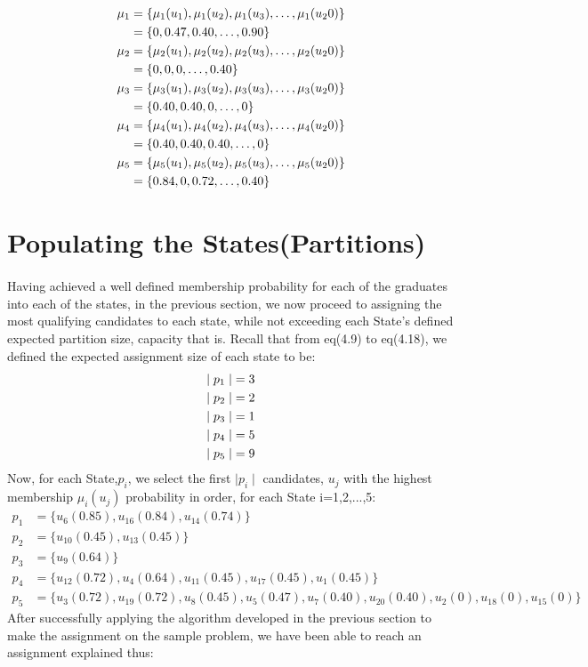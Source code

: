 \documentclass[a4paper]{book}
\begin{document}
				\begin{align}
					\mu_1 &= \{ \mu_1(u_1), \mu_1(u_2), \mu_1(u_3),\dots,\mu_1(u_20) \} \\
					&= \{ 0, 0.47, 0.40,\dots,0.90 \} \notag \\
					\mu_2 &= \{ \mu_2(u_1), \mu_2(u_2), \mu_2(u_3),\dots,\mu_2(u_20) \}\\
					&= \{ 0, 0, 0,\dots,0.40 \} \notag \\
					\mu_3 &= \{ \mu_3(u_1), \mu_3(u_2), \mu_3(u_3),\dots,\mu_3(u_20) \}\\
					&= \{ 0.40, 0.40, 0,\dots,0 \} \notag \\
					\mu_4 &= \{ \mu_4(u_1), \mu_4(u_2), \mu_4(u_3),\dots,\mu_4(u_20) \}\\
					&= \{ 0.40, 0.40, 0.40,\dots,0 \} \notag \\
					\mu_5 &= \{ \mu_5(u_1), \mu_5(u_2), \mu_5(u_3),\dots,\mu_5(u_20) \}\\
					&= \{ 0.84, 0, 0.72,\dots,0.40 \} \notag					
				\end{align}
		\section{Populating the States(Partitions)}
			\paragraph{}
				Having achieved a well defined membership probability for each of the graduates into each of the states, in the previous section, we now proceed to assigning the most qualifying candidates to each state, while not exceeding each State's defined expected partition size, capacity that is.
				Recall that from eq(4.9) to eq(4.18), we defined the expected assignment size of each state to be:
				\begin{align}
					\mid p_1 \mid &= 3 \notag \\
					\mid p_2 \mid &= 2 \notag \\
					\mid p_3 \mid &= 1 \notag \\
					\mid p_4 \mid &= 5 \notag \\
					\mid p_5 \mid &= 9 \notag
				\end{align}
				Now, for each State,$p_i$, we select the first $\mid p_i \mid$ candidates, $u_j$ with the highest membership $\mu_i(u_j)$ probability in order, for each State i=1,2,...,5:
				\begin{align}
					p_1 &= \{u_6(0.85), u_{16}(0.84), u_{14}(0.74)\}\\
					p_2 &= \{u_{10}(0.45), u_{13}(0.45)\}\\
					p_3 &= \{u_{9}(0.64)\}\\
					p_4 &= \{u_{12}(0.72),u_{4}(0.64),u_{11}(0.45),u_{17}(0.45),u_{1}(0.45)\}\\
					p_5 &= \{u_{3}(0.72),u_{19}(0.72),u_{8}(0.45),u_{5}(0.47),u_{7}(0.40),u_{20}(0.40),u_{2}(0),u_{18}(0),u_{15}(0)\}
				\end{align}
				After successfully applying the algorithm developed in the previous section to make the assignment on the sample problem, we have been able to reach an assignment explained thus:
\end{document}
